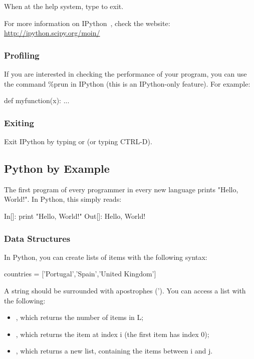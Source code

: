 When at the help system, type  to exit.

For more information on IPython~\citep{PER-GRA:2007}, check the website: \url{http://ipython.scipy.org/moin/}


\subsubsection{Profiling}


If you are interested in checking the performance of your program, you can use the
command \%prun in IPython (this is an IPython-only feature). For example:


\begin{python}
def myfunction(x):
    ...

\end{python}

\subsubsection{Exiting}

Exit IPython by typing  or  (or typing CTRL-D).

\subsection{Python by Example}


The first program of every programmer in every new language prints "Hello,
World!". In Python, this simply reads:

\begin{python}
 In[]: print "Hello, World!"
Out[]: Hello, World!
\end{python}


\subsubsection{Data Structures}

In Python, you can create lists of items with the following syntax:

\begin{python}
countries = ['Portugal','Spain','United Kingdom']
\end{python}

A string should be surrounded with apostrophes ('). You can access a list with
the following:

\begin{itemize}
 \item {}, which returns the number of items in L;
 \item {}, which returns the item at index i (the first item has index 0);
 \item {}, which returns a new list, containing the items between i and j. 
\end{itemize}

